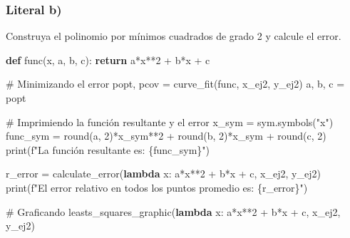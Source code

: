 \documentclass[
  letterpaper,
  DIV=11,
  numbers=noendperiod]{scrartcl}
\newenvironment{Shaded}{\begin{snugshade}}{\end{snugshade}}
\newcommand{\BuiltInTok}[1]{\textcolor[rgb]{0.00,0.23,0.31}{#1}}
\newcommand{\CommentTok}[1]{\textcolor[rgb]{0.37,0.37,0.37}{#1}}
\newcommand{\ControlFlowTok}[1]{\textcolor[rgb]{0.00,0.23,0.31}{\textbf{#1}}}
\newcommand{\DecValTok}[1]{\textcolor[rgb]{0.68,0.00,0.00}{#1}}
\newcommand{\KeywordTok}[1]{\textcolor[rgb]{0.00,0.23,0.31}{\textbf{#1}}}
\newcommand{\NormalTok}[1]{\textcolor[rgb]{0.00,0.23,0.31}{#1}}
\newcommand{\OperatorTok}[1]{\textcolor[rgb]{0.37,0.37,0.37}{#1}}
\newcommand{\SpecialCharTok}[1]{\textcolor[rgb]{0.37,0.37,0.37}{#1}}
\newcommand{\SpecialStringTok}[1]{\textcolor[rgb]{0.13,0.47,0.30}{#1}}
\newcommand{\StringTok}[1]{\textcolor[rgb]{0.13,0.47,0.30}{#1}}
\begin{document}
\subsubsection{Literal b)}\label{literal-b-1}

Construya el polinomio por mínimos cuadrados de grado 2 y calcule el
error.

\begin{Shaded}
\begin{Highlighting}[]

\KeywordTok{def}\NormalTok{ func(x, a, b, c):}
    \ControlFlowTok{return}\NormalTok{ a}\OperatorTok{*}\NormalTok{x}\OperatorTok{**}\DecValTok{2} \OperatorTok{+}\NormalTok{ b}\OperatorTok{*}\NormalTok{x }\OperatorTok{+}\NormalTok{ c}

\CommentTok{\# Minimizando el error}
\NormalTok{popt, pcov }\OperatorTok{=}\NormalTok{ curve\_fit(func, x\_ej2, y\_ej2)}
\NormalTok{a, b, c }\OperatorTok{=}\NormalTok{ popt}

\CommentTok{\# Imprimiendo la función resultante y el error}
\NormalTok{x\_sym }\OperatorTok{=}\NormalTok{ sym.symbols(}\StringTok{"x"}\NormalTok{)}
\NormalTok{func\_sym }\OperatorTok{=} \BuiltInTok{round}\NormalTok{(a, }\DecValTok{2}\NormalTok{)}\OperatorTok{*}\NormalTok{x\_sym}\OperatorTok{**}\DecValTok{2} \OperatorTok{+} \BuiltInTok{round}\NormalTok{(b, }\DecValTok{2}\NormalTok{)}\OperatorTok{*}\NormalTok{x\_sym }\OperatorTok{+} \BuiltInTok{round}\NormalTok{(c, }\DecValTok{2}\NormalTok{)}
\BuiltInTok{print}\NormalTok{(}\SpecialStringTok{f"La función resultante es: }\SpecialCharTok{\{}\NormalTok{func\_sym}\SpecialCharTok{\}}\SpecialStringTok{"}\NormalTok{)}

\NormalTok{r\_error }\OperatorTok{=}\NormalTok{ calculate\_error(}\KeywordTok{lambda}\NormalTok{ x: a}\OperatorTok{*}\NormalTok{x}\OperatorTok{**}\DecValTok{2} \OperatorTok{+}\NormalTok{ b}\OperatorTok{*}\NormalTok{x }\OperatorTok{+}\NormalTok{ c, x\_ej2, y\_ej2)}
\BuiltInTok{print}\NormalTok{(}\SpecialStringTok{f"El error relativo en todos los puntos promedio es: }\SpecialCharTok{\{}\NormalTok{r\_error}\SpecialCharTok{\}}\SpecialStringTok{"}\NormalTok{)}

\CommentTok{\# Graficando}
\NormalTok{leasts\_squares\_graphic(}\KeywordTok{lambda}\NormalTok{ x: a}\OperatorTok{*}\NormalTok{x}\OperatorTok{**}\DecValTok{2} \OperatorTok{+}\NormalTok{ b}\OperatorTok{*}\NormalTok{x }\OperatorTok{+}\NormalTok{ c, x\_ej2, y\_ej2)}
\end{Highlighting}
\end{Shaded}
\end{document}
